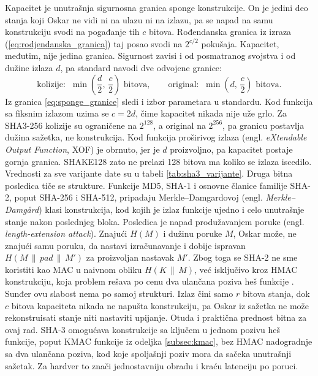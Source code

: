 Kapacitet je unutrašnja sigurnosna granica sponge konstrukcije. On je jedini deo stanja koji Oskar ne vidi ni na ulazu ni na izlazu, pa se napad na samu konstrukciju svodi na pogađanje tih $c$ bitova. Rođendanska granica iz izraza (\ref{eq:rodjendanska_granica}) taj posao svodi na $2^{c/2}$ pokušaja.
\smallbreak
Kapacitet, međutim, nije jedina granica. Sigurnost zavisi i od posmatranog svojstva i od dužine izlaza $d$, pa standard \cite{fips202} navodi dve odvojene granice:
\begin{equation}
    \text{kolizije:}\;\; \min\!\left(\frac{d}{2},\, \frac{c}{2}\right) \text{ bitova}, \qquad
    \text{original:}\;\; \min\!\left(d,\, \frac{c}{2}\right) \text{ bitova}.
    \label{eq:sponge_granice}
\end{equation}
Iz granica \eqref{eq:sponge_granice} sledi i izbor parametara u standardu. Kod funkcija sa fiksnim izlazom uzima se $c = 2d$, čime kapacitet nikada nije uže grlo. Za SHA3-256 kolizije su ograničene na $2^{128}$, a original na $2^{256}$, pa granicu postavlja dužina sažetka, ne konstrukcija. Kod funkcija proširivog izlaza (engl. \textit{eXtendable Output Function}, XOF) je obrnuto, jer je $d$ proizvoljno, pa kapacitet postaje gornja granica. SHAKE128 zato ne prelazi 128 bitova ma koliko se izlaza iscedilo. Vrednosti za sve varijante date su u tabeli \ref{tab:sha3_varijante}.
\smallbreak
Druga bitna posledica tiče se strukture. Funkcije MD5, SHA-1 i osnovne članice familije SHA-2, poput SHA-256 i SHA-512, pripadaju Merkle--Damgardovoj (engl. \textit{Merkle--Damg\r{a}rd}) klasi konstrukcija, kod kojih je izlaz funkcije ujedno i celo unutrašnje stanje nakon poslednjeg bloka. Posledica je napad produžavanjem poruke (engl. \textit{length-extension attack}). Znajući $H(M)$ i dužinu poruke $M$, Oskar može, ne znajući samu poruku, da nastavi izračunavanje i dobije ispravan $H(M \,\|\, pad \,\|\, M')$ za proizvoljan nastavak $M'$. Zbog toga se SHA-2 ne sme koristiti kao MAC u naivnom obliku $H(K \,\|\, M)$, već isključivo kroz HMAC konstrukciju, koja problem rešava po cenu dva ulančana poziva heš funkcije \cite{paar_pelzl, katz_lindell}.
\smallbreak
Sunđer ovu slabost nema po samoj strukturi. Izlaz čini samo $r$ bitova stanja, dok $c$ bitova kapaciteta nikada ne napušta konstrukciju, pa Oskar iz sažetka ne može rekonstruisati stanje niti nastaviti upijanje. Otuda i praktična prednost bitna za ovaj rad. SHA-3 omogućava konstrukcije sa ključem u jednom pozivu heš funkcije, poput KMAC funkcije iz odeljka \ref{subsec:kmac}, bez HMAC nadogradnje sa dva ulančana poziva, kod koje spoljašnji poziv mora da sačeka unutrašnji sažetak. Za hardver to znači jednostavniju obradu i kraću latenciju po poruci.

